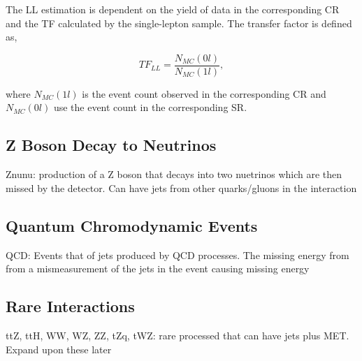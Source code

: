 The LL estimation is dependent on the yield of data in the corresponding CR and the TF calculated by the single-lepton sample. The transfer factor is defined as, 

\begin{equation}
\label{eqn:TF}
TF_{LL}=\frac{N_{MC}(0l)}{N_{MC}(1l)},
\end{equation}

where $N_{MC}(1l)$ is the event count observed in the corresponding CR and $N_{MC}(0l)$ use the event count in the corresponding SR. 






\subsection{Z Boson Decay to Neutrinos}
\label{subsec:Znunu}

Znunu: production of a Z boson that decays into two nuetrinos which are then missed by the detector. Can have jets from other quarks/gluons in the interaction

\subsection{Quantum Chromodynamic Events}
\label{subsec:QCD}

QCD: Events that of jets produced by QCD processes. The missing energy from from a mismeasurement of the jets in the event causing missing energy

\subsection{Rare Interactions}
\label{subsec:rare}

ttZ, ttH, WW, WZ, ZZ, tZq, tWZ: rare processed that can have jets plus MET. Expand upon these later
